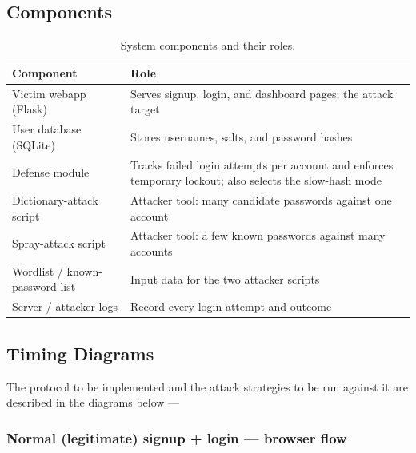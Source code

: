 \documentclass[11pt]{article}
\begin{document}
\subsection{Components}

\begin{table}[H]
\centering
\begin{tabularx}{\textwidth}{@{} l X @{}}
\toprule
\rowcolor{navy!12}
\textbf{Component} & \textbf{Role} \\
\midrule
Victim webapp (Flask) & Serves signup, login, and dashboard pages; the attack target \\
User database (SQLite) & Stores usernames, salts, and password hashes \\
Defense module & Tracks failed login attempts per account and enforces temporary lockout; also selects the slow-hash mode \\
Dictionary-attack script & Attacker tool: many candidate passwords against one account \\
Spray-attack script & Attacker tool: a few known passwords against many accounts \\
Wordlist / known-password list & Input data for the two attacker scripts \\
Server / attacker logs & Record every login attempt and outcome \\
\bottomrule
\end{tabularx}
\caption{System components and their roles.}
\end{table}

\newpage
\subsection{Timing Diagrams}

The protocol to be implemented and the attack strategies to be run against it are
described in the diagrams below --- 

\subsubsection{Normal (legitimate) signup + login --- browser flow}
\end{document}
